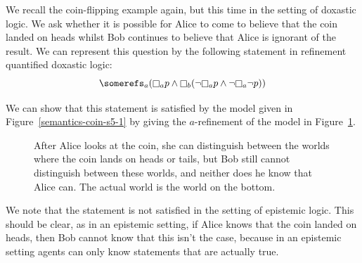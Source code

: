 \begin{example}\label{semantics-coin-kd45}
We recall the coin-flipping example again, but this time in the setting of
doxastic logic. We ask whether it is possible for Alice to come to believe that
the coin landed on heads whilst Bob continues to believe that Alice is ignorant
of the result. We can represent this question by the following statement in
refinement quantified doxastic logic:
$$\somerefs_a (\knows_a p \land \knows_b (\neg \knows_a p \land \neg \knows_a
\neg p))$$

We can show that this statement is satisfied by the model given in
Figure~\ref{semantics-coin-s5-1} by giving the $a$-refinement of the
model in Figure~\ref{semantics-coin-kd45-1}.

\begin{figure}
\begin{center} 
\caption{\label{semantics-coin-kd45-1}
After Alice looks at the coin, she can distinguish between the worlds where the
coin lands on heads or tails, but Bob still cannot distinguish between these
worlds, and neither does he know that Alice can. The actual world is the world
on the bottom.
}
\end{center}
\end{figure}

We note that the statement is not satisfied in the setting of epistemic logic.
This should be clear, as in an epistemic setting, if Alice knows that the coin
landed on heads, then Bob cannot know that this isn't the case, because in an
epistemic setting agents can only know statements that are actually true.
\end{example}

